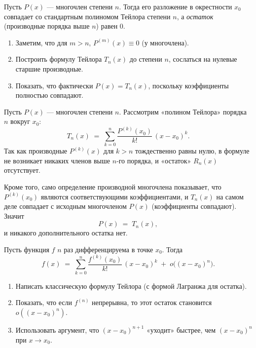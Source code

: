 
\begin{customtheorem}
	Пусть $P(x)$ — многочлен степени $n$. Тогда его разложение в окрестности $x_0$
	совпадает со стандартным полиномом Тейлора степени $n$, а
	\emph{остаток} (производные порядка выше $n$) равен 0.
\end{customtheorem}

\begin{proofplan}
	\begin{enumerate}
		\item Заметим, что для $m>n$, $P^{(m)}(x)\equiv0$ (у многочлена).
		\item Построить формулу Тейлора $T_n(x)$ до степени $n$, сослаться на нулевые старшие производные.
		\item Показать, что фактически $P(x)=T_n(x)$, поскольку коэффициенты полностью совпадают.
	\end{enumerate}
\end{proofplan}

\begin{customproof}
	Пусть $P(x)$ — многочлен степени $n$. Рассмотрим «полином Тейлора» порядка $n$ вокруг $x_0$:
	\[
		T_n(x) \;=\; \sum_{k=0}^{n} \frac{P^{(k)}(x_0)}{k!}\,(x - x_0)^k.
	\]
	Так как производные $P^{(k)}(x)$ для $k>n$ тождественно равны нулю, в формуле не возникает никаких членов выше $n$‐го порядка, и «остаток» $R_n(x)$ отсутствует.

	Кроме того, само определение производной многочлена показывает, что $P^{(k)}(x_0)$ являются соответствующими коэффициентами, и $T_n(x)$ на самом деле совпадает с исходным многочленом $P(x)$ (коэффициенты совпадают). Значит
	\[
		P(x) \;=\; T_n(x),
	\]
	и никакого дополнительного остатка нет.
\end{customproof}

\begin{customtheorem}
	Пусть функция $f$ $n$ раз дифференцируема в точке $x_0$. Тогда
	\[
		f(x)
		\;=\;
		\sum_{k=0}^{n}
		\frac{f^{(k)}(x_0)}{k!}\,(x - x_0)^k
		\;+\;
		o\bigl((x - x_0)^n\bigr).
	\]
\end{customtheorem}

\begin{proofplan}
	\begin{enumerate}
		\item Написать классическую формулу Тейлора (с формой Лагранжа для остатка).
		\item Показать, что если $f^{(n)}$ непрерывна, то этот остаток становится $o((x - x_0)^n)$.
		\item Использовать аргумент, что $(x - x_0)^{n+1}$ «уходит» быстрее, чем $(x - x_0)^n$ при $x\to x_0$.
	\end{enumerate}
\end{proofplan}


